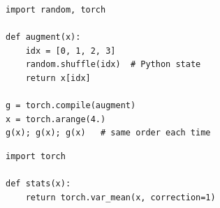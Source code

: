 \newcommand{\layercell}[3]{%
  \node[draw=black!40, fill=#2, minimum width=1.5cm, minimum height=0.62cm, font=\scriptsize, align=center,
        inner sep=1pt] (#1) {#3};}
\begin{figure}[t]
\centering
\begin{minipage}[t]{0.485\linewidth}
\begin{lstlisting}
import random, torch

def augment(x):
    idx = [0, 1, 2, 3]
    random.shuffle(idx)  # Python state
    return x[idx]

g = torch.compile(augment)
x = torch.arange(4.)
g(x); g(x); g(x)   # same order each time
\end{lstlisting}
\centering
{}
\end{minipage}\hfill
\begin{minipage}[t]{0.485\linewidth}
\begin{lstlisting}
import torch

def stats(x):
    return torch.var_mean(x, correction=1)


\end{lstlisting}
\end{minipage}
\end{figure}
